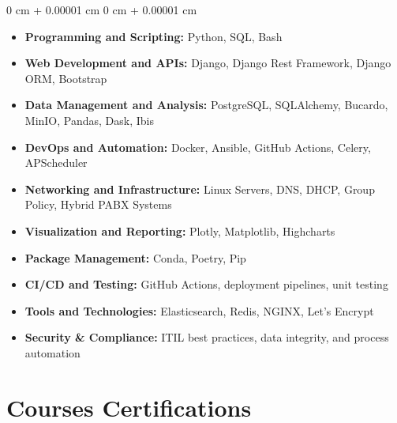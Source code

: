 \documentclass[10pt, letterpaper]{article}
\newenvironment{highlights}{
    \begin{itemize}[
        topsep=0.10 cm,
        parsep=0.10 cm,
        partopsep=0pt,
        itemsep=0pt,
        leftmargin=0 cm + 10pt
    ]
}{
    \end{itemize}
} %
\newenvironment{onecolentry}{
    \begin{adjustwidth}{
        0 cm + 0.00001 cm
    }{
        0 cm + 0.00001 cm
    }
}{
    \end{adjustwidth}
} %
\begin{document}
        \begin{onecolentry}
            \begin{highlights}
        
                \item \textbf{Programming and Scripting:} Python, SQL, Bash
                \item \textbf{Web Development and APIs:} Django, Django Rest Framework, Django ORM, Bootstrap
                \item \textbf{Data Management and Analysis:} PostgreSQL, SQLAlchemy, Bucardo, MinIO, Pandas, Dask, Ibis
                \item \textbf{DevOps and Automation:} Docker, Ansible, GitHub Actions, Celery, APScheduler
                \item \textbf{Networking and Infrastructure:} Linux Servers, DNS, DHCP, Group Policy, Hybrid PABX Systems
                \item \textbf{Visualization and Reporting:} Plotly, Matplotlib, Highcharts
                \item \textbf{Package Management:} Conda, Poetry, Pip
                \item \textbf{CI/CD and Testing:} GitHub Actions, deployment pipelines, unit testing
                \item \textbf{Tools and Technologies:} Elasticsearch, Redis, NGINX, Let’s Encrypt
                \item \textbf{Security & Compliance:} ITIL best practices, data integrity, and process automation  
                
            \end{highlights}
        \end{onecolentry}
    
        \vspace{0.2 cm}



    \section{Courses \band Certifications}
\end{document}
